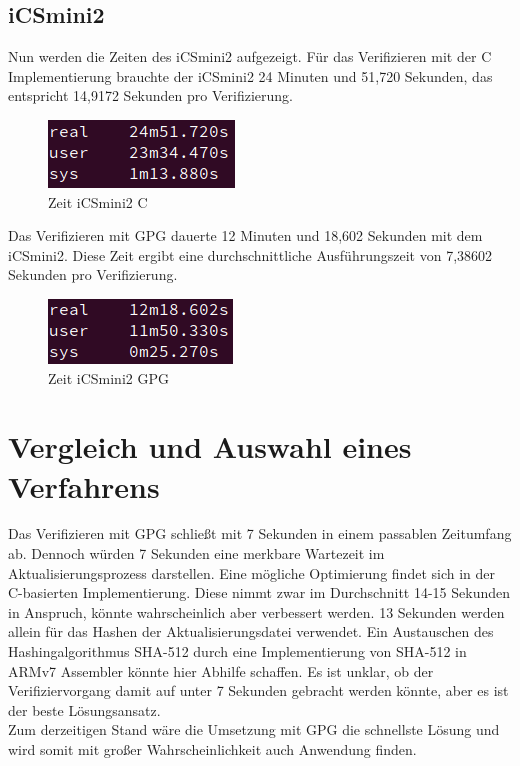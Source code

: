 \documentclass[thesis=bachelor,faculty=cb]{hsmw-thesis}
\begin{document}
{\subsection*{iCSmini2}
\noindent
Nun werden die Zeiten des iCSmini2 aufgezeigt. Für das Verifizieren mit der C Implementierung brauchte der iCSmini2 24 Minuten und 51,720 Sekunden, das entspricht 14,9172 Sekunden pro Verifizierung.
\begin{figure}[H]
	\centering
	\includegraphics[scale=0.8]{images/ICS_MINI_C_100.PNG}
	\caption{Zeit iCSmini2 C}
\end{figure}
Das Verifizieren mit GPG dauerte 12 Minuten und 18,602 Sekunden mit dem iCSmini2. Diese Zeit ergibt eine durchschnittliche Ausführungszeit von 7,38602 Sekunden pro Verifizierung.
\begin{figure}[H]
	\centering
	\includegraphics[scale=0.8]{images/ICSMINIII_GPG.PNG}
	\caption{Zeit iCSmini2 GPG}
\end{figure}
\newpage
\section{Vergleich und Auswahl eines Verfahrens}
Das Verifizieren mit GPG schließt mit 7 Sekunden in einem passablen Zeitumfang ab. Dennoch würden 7 Sekunden eine merkbare Wartezeit im Aktualisierungsprozess darstellen. Eine mögliche Optimierung findet sich in der C-basierten Implementierung. Diese nimmt zwar im Durchschnitt 14-15 Sekunden in Anspruch, könnte wahrscheinlich aber verbessert werden. 13 Sekunden werden allein für das Hashen der Aktualisierungsdatei verwendet. Ein Austauschen des Hashingalgorithmus SHA-512 durch eine Implementierung von SHA-512 in ARMv7 Assembler könnte hier Abhilfe schaffen. Es ist unklar, ob der Verifiziervorgang damit auf unter 7 Sekunden gebracht werden könnte, aber es ist der beste Lösungsansatz.
\\[1cm]
Zum derzeitigen Stand wäre die Umsetzung mit GPG die schnellste Lösung und wird somit mit großer Wahrscheinlichkeit auch Anwendung finden.
}
\end{document}
